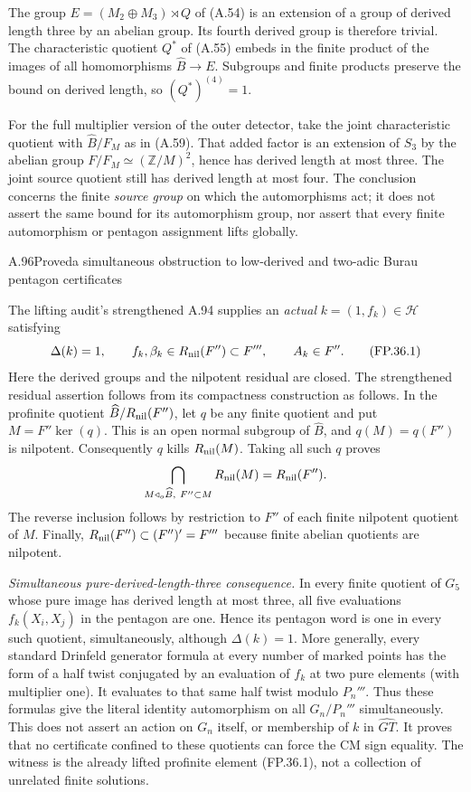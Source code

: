The group $E=(M_2\oplus M_3)\rtimes Q$ of (A.54) is an
extension of a group of derived length three by an abelian group.
Its fourth derived group is therefore trivial. The characteristic
quotient $Q^*$ of (A.55) embeds in the finite product of the
images of all homomorphisms $\widehat B\to E$. Subgroups and
finite products preserve the bound on derived length, so
$(Q^*)^{(4)}=1$.

For the full multiplier version of the outer detector, take the
joint characteristic quotient with $\widehat B/F_M$ as in
(A.59). That added factor is an extension of $S_3$ by the
abelian group $F/F_M\simeq(\mathbb Z/M)^2$, hence has derived
length at most three. The joint source quotient still has derived
length at most four. The conclusion concerns the finite
\emph{source group} on which the automorphisms act; it does not
assert the same bound for its automorphism group, nor assert that
every finite automorphism or pentagon assignment lifts globally.

\begin{statement}{A.96}{Proved}{a simultaneous obstruction to low-derived and two-adic Burau pentagon certificates}
\end{statement}
The lifting audit's strengthened A.94 supplies an \emph{actual}
$k=(1,f_k)\in\mathcal H$ satisfying
\[
 \Delta(k)=1,\qquad
 f_k,\beta_k\in R_{\rm nil}(F'')\subset F''',\qquad A_k\in F''.
 \tag{FP.36.1}
\]
Here the derived groups and the nilpotent residual are closed.
The strengthened residual assertion follows from its compactness
construction as follows. In the profinite quotient
$\widehat B/R_{\rm nil}(F'')$, let $q$ be any finite quotient
and put $M=F''\ker(q)$. This is an open normal subgroup of
$\widehat B$, and $q(M)=q(F'')$ is nilpotent. Consequently
$q$ kills $R_{\rm nil}(M)$. Taking all such $q$ proves
\[
 \bigcap_{M\mathrel{\triangleleft_o}\widehat B,\ F''\subset M}
             R_{\rm nil}(M)=R_{\rm nil}(F'').
\]
The reverse inclusion follows by restriction to $F''$ of each
finite nilpotent quotient of $M$. Finally,
$R_{\rm nil}(F'')\subset(F'')'=F'''$ because finite abelian
quotients are nilpotent.

\emph{Simultaneous pure-derived-length-three consequence.}
In every finite quotient of $G_5$ whose pure image has derived
length at most three, all five evaluations
$f_k(X_i,X_j)$ in the pentagon are one. Hence its pentagon
word is one in every such quotient, simultaneously, although
$\Delta(k)=1$. More generally, every standard Drinfeld
generator formula at every number of marked points has the form
of a half twist conjugated by an evaluation of $f_k$ at two pure
elements (with multiplier one). It evaluates to that same half
twist modulo $P_n'''$. Thus these formulas give the literal
identity automorphism on all $G_n/P_n'''$ simultaneously.
This does not assert an action on $G_n$ itself, or membership of
$k$ in $\widehat{GT}$. It proves that no certificate confined to
these quotients can force the CM sign equality. The witness is
the already lifted profinite element (FP.36.1), not a collection
of unrelated finite solutions.

